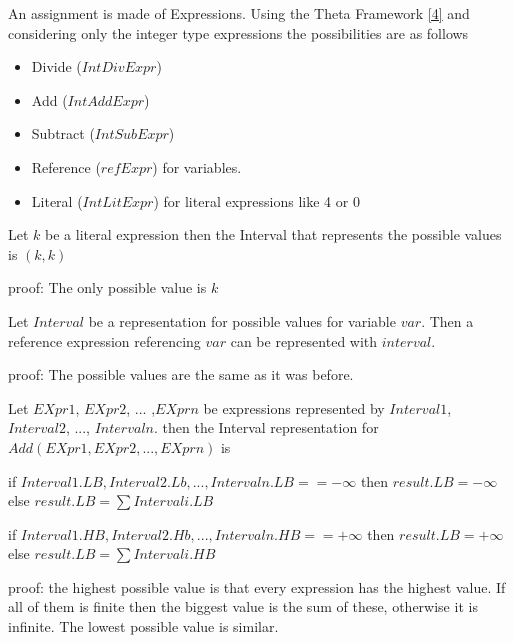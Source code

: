 An assignment is made of Expressions. Using the Theta Framework \hyperref[sec:ref]{[4]} and considering only the integer type expressions the possibilities are as follows
\begin{itemize}
	\item Divide ($IntDivExpr$)
	\item Add ($IntAddExpr$)
	\item Subtract ($IntSubExpr$)
	\item Reference ($refExpr$) for variables.
	\item Literal ($IntLitExpr$) for literal expressions like 4 or 0
\end{itemize}

\begin{theorem}
	Let $k$ be a literal expression then the Interval that represents the possible values is $(k, k)$
\end{theorem}
{proof: } The only possible value is $k$

\begin{theorem}
	Let $Interval$ be a representation for possible values for variable $var$. Then a reference expression referencing $var$ can be represented with $interval$.
\end{theorem}
{proof: } The possible values are the same as it was before.

\begin{theorem}
	Let $EXpr1$, $EXpr2$, ... ,$EXprn$ be expressions represented by $Interval1$, $Interval2$, ..., $Intervaln$. then the Interval representation for $Add(EXpr1, EXpr2, ... ,EXprn)$ is
	
	if $Interval1.LB, Interval2.Lb, ... ,Intervaln.LB == -\infty$ then $result.LB=-\infty$
	else  $result.LB=\sum{Intervali.LB}$
	
	if $Interval1.HB, Interval2.Hb, ... ,Intervaln.HB == +\infty$ then $result.LB=+\infty$
	else  $result.LB=\sum{Intervali.HB}$
\end{theorem}
{proof: } the highest possible value is that every expression has the highest value. If all of them is finite then the biggest value is the sum of these, otherwise it is infinite. The lowest possible value is similar.


